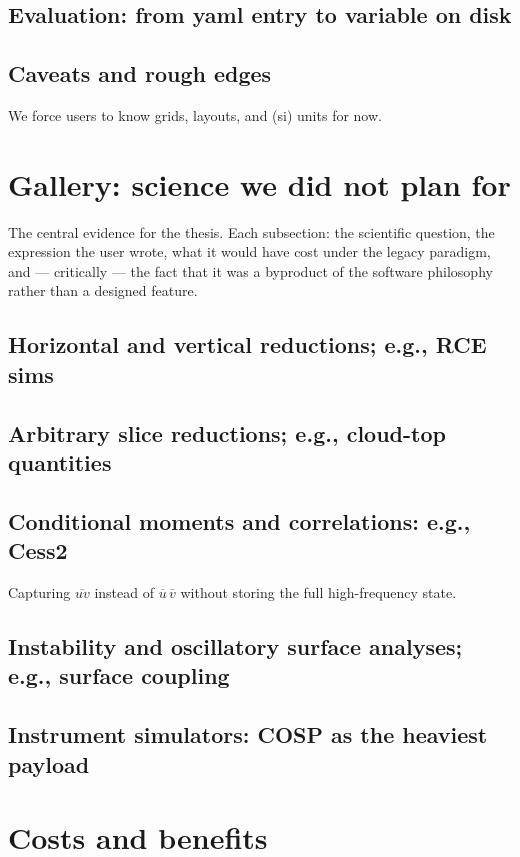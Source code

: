 \documentclass[gmd, manuscript]{copernicus}
\begin{document}
\subsection{Evaluation: from yaml entry to variable on disk}


\subsection{Caveats and rough edges}
We force users to know grids, layouts, and (si) units for now.

\section{Gallery: science we did not plan for}
{The central evidence for the thesis. Each subsection: the scientific question, the expression
the user wrote, what it would have cost under the legacy paradigm, and --- critically --- the fact
that it was a byproduct of the software philosophy rather than a designed feature.}

\subsection{Horizontal and vertical reductions; e.g., RCE sims}

\subsection{Arbitrary slice reductions; e.g., cloud-top quantities}

\subsection{Conditional moments and correlations: e.g., Cess2}
{Capturing $\overline{uv}$ instead of $\overline{u}\,\overline{v}$ without storing the full high-frequency state.}

\subsection{Instability and oscillatory surface analyses; e.g., surface coupling}

\subsection{Instrument simulators: COSP as the heaviest payload}

\section{Costs and benefits}
\end{document}
